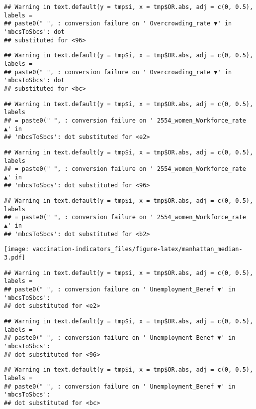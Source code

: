 \documentclass[
]{article}
\begin{document}
\begin{verbatim}
## Warning in text.default(y = tmp$i, x = tmp$OR.abs, adj = c(0, 0.5), labels =
## paste0(" ", : conversion failure on ' Overcrowding_rate ▼' in 'mbcsToSbcs': dot
## substituted for <96>
\end{verbatim}

\begin{verbatim}
## Warning in text.default(y = tmp$i, x = tmp$OR.abs, adj = c(0, 0.5), labels =
## paste0(" ", : conversion failure on ' Overcrowding_rate ▼' in 'mbcsToSbcs': dot
## substituted for <bc>
\end{verbatim}

\begin{verbatim}
## Warning in text.default(y = tmp$i, x = tmp$OR.abs, adj = c(0, 0.5), labels
## = paste0(" ", : conversion failure on ' 2554_women_Workforce_rate ▲' in
## 'mbcsToSbcs': dot substituted for <e2>
\end{verbatim}

\begin{verbatim}
## Warning in text.default(y = tmp$i, x = tmp$OR.abs, adj = c(0, 0.5), labels
## = paste0(" ", : conversion failure on ' 2554_women_Workforce_rate ▲' in
## 'mbcsToSbcs': dot substituted for <96>
\end{verbatim}

\begin{verbatim}
## Warning in text.default(y = tmp$i, x = tmp$OR.abs, adj = c(0, 0.5), labels
## = paste0(" ", : conversion failure on ' 2554_women_Workforce_rate ▲' in
## 'mbcsToSbcs': dot substituted for <b2>
\end{verbatim}

\texttt{[image: vaccination-indicators\_files/figure-latex/manhattan\_median-3.pdf]}

\begin{verbatim}
## Warning in text.default(y = tmp$i, x = tmp$OR.abs, adj = c(0, 0.5), labels =
## paste0(" ", : conversion failure on ' Unemployment_Benef ▼' in 'mbcsToSbcs':
## dot substituted for <e2>
\end{verbatim}

\begin{verbatim}
## Warning in text.default(y = tmp$i, x = tmp$OR.abs, adj = c(0, 0.5), labels =
## paste0(" ", : conversion failure on ' Unemployment_Benef ▼' in 'mbcsToSbcs':
## dot substituted for <96>
\end{verbatim}

\begin{verbatim}
## Warning in text.default(y = tmp$i, x = tmp$OR.abs, adj = c(0, 0.5), labels =
## paste0(" ", : conversion failure on ' Unemployment_Benef ▼' in 'mbcsToSbcs':
## dot substituted for <bc>
\end{verbatim}
\end{document}
